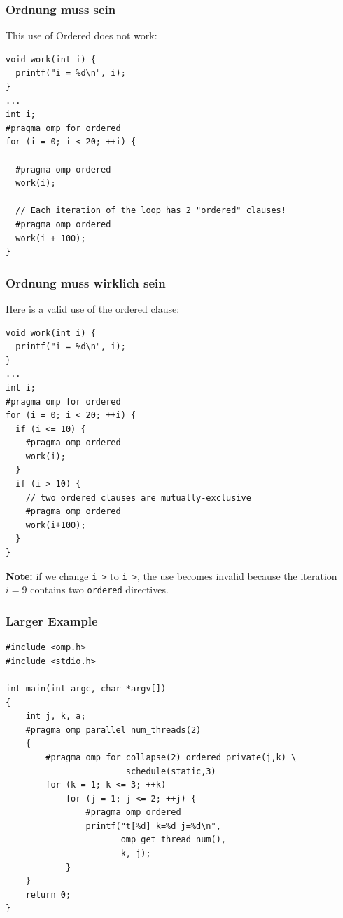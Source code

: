 \begin{frame}[fragile]
\frametitle{Ordnung muss sein}

This use of Ordered does not work:

  \begin{lstlisting}
void work(int i) {
  printf("i = %d\n", i);
}
...
int i;
#pragma omp for ordered
for (i = 0; i < 20; ++i) {

  #pragma omp ordered
  work(i);

  // Each iteration of the loop has 2 "ordered" clauses!
  #pragma omp ordered 
  work(i + 100);
}
\end{lstlisting}


\end{frame}


\begin{frame}[fragile]
\frametitle{Ordnung muss wirklich sein}

Here is a valid use of the ordered clause:
 \begin{lstlisting}
void work(int i) {
  printf("i = %d\n", i);
}
...
int i;
#pragma omp for ordered
for (i = 0; i < 20; ++i) {
  if (i <= 10) {
    #pragma omp ordered
    work(i);
  }
  if (i > 10) {
    // two ordered clauses are mutually-exclusive
    #pragma omp ordered
    work(i+100);
  }
}
  \end{lstlisting}

{\bf Note:} if we change {\tt i \textgreater{}} to {\tt i \textgreater{}}, 
the use becomes invalid because the iteration $i=9$ contains two {\tt ordered}
directives.

\end{frame}


\begin{frame}[fragile]
\frametitle{Larger Example}

  \begin{lstlisting}
#include <omp.h>
#include <stdio.h>

int main(int argc, char *argv[])
{
    int j, k, a;
    #pragma omp parallel num_threads(2)
    {
        #pragma omp for collapse(2) ordered private(j,k) \
                        schedule(static,3)
        for (k = 1; k <= 3; ++k)
            for (j = 1; j <= 2; ++j) {
                #pragma omp ordered
                printf("t[%d] k=%d j=%d\n",
                       omp_get_thread_num(),
                       k, j);
            }
    }
    return 0;
}
  \end{lstlisting}

\end{frame}

